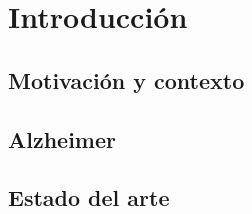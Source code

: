 \chapter{Introducción}\label{ch:introduccion}


\section{Motivación y contexto}\label{sec:motivacion-y-contexto}


\section{Alzheimer}\label{sec:alzheimer}


\section{Estado del arte}\label{sec:estado-del-arte}


%
%
%